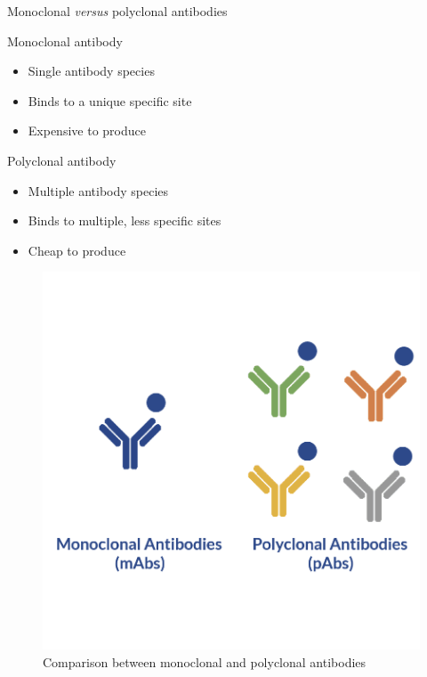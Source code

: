 \begin{frame}{Monoclonal \textit{versus} polyclonal antibodies}
    \begin{minipage}{0.5\textwidth}
        \begin{block}{Monoclonal antibody}

            \begin{itemize}
                \item Single antibody species
                \item Binds to a unique specific site
                \item Expensive to produce
            \end{itemize}
        \end{block}

        \begin{block}{Polyclonal antibody}
            \begin{itemize}
                \item Multiple antibody species
                \item Binds to multiple, less specific sites
                \item Cheap to produce
            \end{itemize}
        \end{block}
    \end{minipage}\hfill
    \begin{minipage}{0.45\textwidth}
        \begin{figure}
            \centering
            \includegraphics[width=\textwidth]{../Images/schematics_mono_poly.png}
            \caption{Comparison between monoclonal and polyclonal antibodies}
        \end{figure}    
    \end{minipage}
\end{frame}